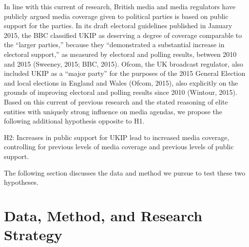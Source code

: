 \documentclass[12pt,article]{article}
\begin{document}
In line with this current of research, British media and media
regulators have publicly argued media coverage given to political
parties is based on public support for the parties. In its draft
electoral guidelines published in January 2015, the BBC classified UKIP
as deserving a degree of coverage comparable to the ``larger parties,''
because they ``demonstrated a substantial increase in electoral
support,'' as measured by electoral and polling results, between 2010
and 2015 (Sweeney, 2015; BBC, 2015). Ofcom, the UK broadcast regulator,
also included UKIP as a ``major party'' for the purposes of the 2015
General Election and local elections in England and Wales (Ofcom, 2015),
also explicitly on the grounds of improving electoral and polling
results since 2010 (Wintour, 2015). Based on this current of previous
research and the stated reasoning of elite entities with uniquely strong
influence on media agendas, we propose the following additional
hypothesis opposite to H1.

H2: Increases in public support for UKIP lead to increased media
coverage, controlling for previous levels of media coverage and previous
levels of public support.

The following section discusses the data and method we pursue to test
these two hypotheses.

\section{Data, Method, and Research
Strategy}\label{data-method-and-research-strategy}
\end{document}
